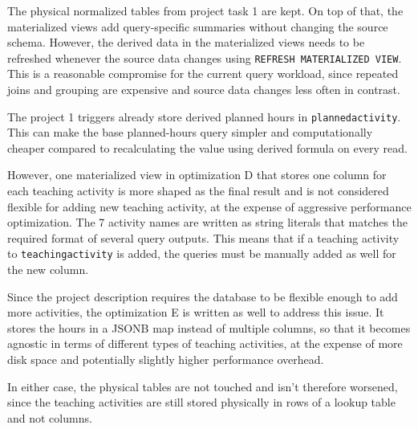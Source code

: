 \documentclass[a4paper]{scrartcl}
\renewcommand{\_}{\textunderscore\allowbreak}
\begin{document}
The physical normalized tables from project task 1 are kept. On top of that, the materialized views add query-specific summaries without changing the source schema. However, the derived data in the materialized views needs to be refreshed whenever the source data changes using \texttt{REFRESH MATERIALIZED VIEW}. This is a reasonable compromise for the current query workload, since repeated joins and grouping are expensive and source data changes less often in contrast.

The project 1 triggers already store derived planned hours in \texttt{planned\_activity}. This can make the base planned-hours query simpler and computationally cheaper compared to recalculating the value using derived formula on every read. 

However, one materialized view in optimization D that stores one column for each teaching activity is more shaped as the final result and is not considered flexible for adding new teaching activity, at the expense of aggressive performance optimization. The 7 activity names are written as string literals that matches the required format of several query outputs. This means that if a teaching activity to \texttt{teaching\_activity} is added, the queries must be manually added as well for the new column.

Since the project description requires the database to be flexible enough to add more activities, the optimization E is written as well to address this issue. It stores the hours in a JSONB map instead of multiple columns, so that it becomes agnostic in terms of different types of teaching activities, at the expense of more disk space and potentially slightly higher performance overhead.

In either case, the physical tables are not touched and isn't therefore worsened, since the teaching activities are still stored physically in rows of a lookup table and not columns.

\end{document}

